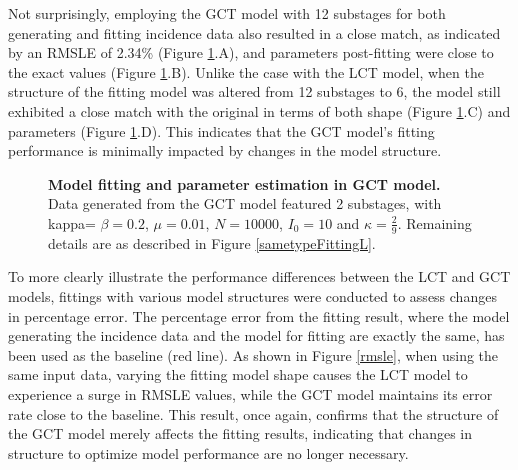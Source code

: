 \documentclass[12pt]{article}
\begin{document}
Not surprisingly, employing the GCT model with 12 substages for both generating and fitting incidence data also resulted in a close match, as indicated by an RMSLE of 2.34\% (Figure \ref{sametypeFittingG}.A), and parameters post-fitting were close to the exact values (Figure \ref{sametypeFittingG}.B). Unlike the case with the LCT model, when the structure of the fitting model was altered from 12 substages to 6, the model still exhibited a close match with the original in terms of both shape (Figure \ref{sametypeFittingG}.C) and parameters (Figure \ref{sametypeFittingG}.D). This indicates that the GCT model's fitting performance is minimally impacted by changes in the model structure.

\begin{figure}[h!]
    \centering
    \caption{\textbf{Model fitting and parameter estimation in GCT model.} \\ Data generated from the GCT model featured 2 substages, with kappa= $\beta=0.2$, $\mu=0.01$, $N=10000$, $I_0=10$ and $\kappa=\frac{2}{9}$. Remaining details are as described in Figure \ref{sametypeFittingL}.}
    \label{sametypeFittingG}
\end{figure}

To more clearly illustrate the performance differences between the LCT and GCT models, fittings with various model structures were conducted to assess changes in percentage error. The percentage error from the fitting result, where the model generating the incidence data and the model for fitting are exactly the same, has been used as the baseline (red line). As shown in Figure \ref{rmsle}, when using the same input data, varying the fitting model shape causes the LCT model to experience a surge in RMSLE values, while the GCT model maintains its error rate close to the baseline. This result, once again, confirms that the structure of the GCT model merely affects the fitting results, indicating that changes in structure to optimize model performance are no longer necessary.
\end{document}
